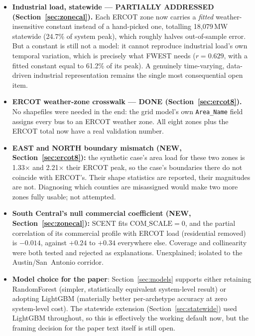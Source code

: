 \documentclass[11pt]{article}
\begin{document}
\begin{itemize}
    for tracts (50 parts) cut load-carrying buses with zero dwellings from 1{,}824 to 25.
    \item \textbf{Industrial load, statewide --- PARTIALLY ADDRESSED
    (Section~\ref{sec:zonecal}).} Each ERCOT zone now carries a \emph{fitted}
    weather-insensitive constant instead of a hand-picked one, totalling 18{,}079\,MW
    statewide (24.7\% of system peak), which roughly halves out-of-sample error. But a
    constant is still not a model: it cannot reproduce industrial load's own temporal
    variation, which is precisely what FWEST needs ($r=0.629$, with a fitted constant
    equal to 61.2\% of its peak). A genuinely time-varying, data-driven industrial
    representation remains the single most consequential open item.
    \item \textbf{ERCOT weather-zone crosswalk --- DONE (Section~\ref{sec:ercot8}).}
    No shapefiles were needed in the end: the grid model's own \texttt{Area\_Name}
    field assigns every bus to an ERCOT weather zone. All eight zones plus the ERCOT
    total now have a real validation number.
    \item \textbf{EAST and NORTH boundary mismatch (NEW,
    Section~\ref{sec:ercot8}):} the synthetic case's area load for these two zones is
    1.33$\times$ and 2.21$\times$ their ERCOT peak, so the case's boundaries there do not
    coincide with ERCOT's. Their shape statistics are reported, their magnitudes are
    not. Diagnosing which counties are misassigned would make two more zones fully
    usable; not attempted.
    \item \textbf{South Central's null commercial coefficient (NEW,
    Section~\ref{sec:zonecal}):} SCENT fits $\mathrm{COM\_SCALE}=0$, and the partial
    correlation of its commercial profile with ERCOT load (residential removed) is
    $-0.014$, against $+0.24$ to $+0.34$ everywhere else. Coverage and collinearity were
    both tested and rejected as explanations. Unexplained; isolated to the
    Austin/San~Antonio corridor.
    \item \textbf{Model choice for the paper}: Section~\ref{sec:models} supports
    either retaining RandomForest (simpler, statistically equivalent system-level
    result) or adopting LightGBM (materially better per-archetype accuracy at zero
    system-level cost). The statewide extension (Section~\ref{sec:statewide}) used
    LightGBM throughout, so this is effectively the working default now, but the
    framing decision for the paper text itself is still open.
\end{itemize}
\end{document}
